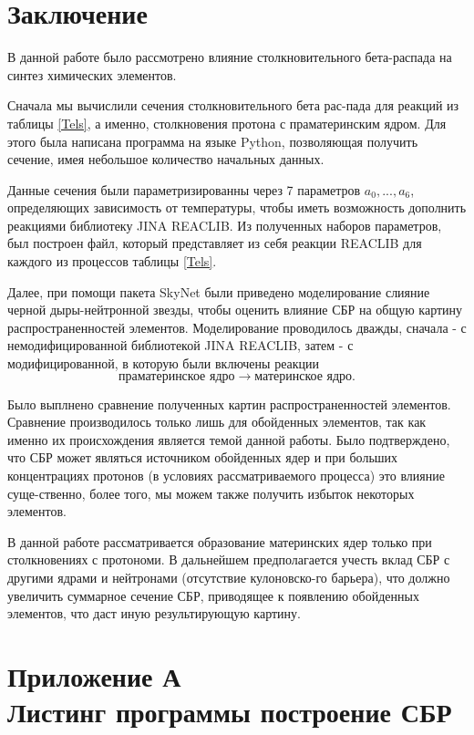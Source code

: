\documentclass[14pt, a4paper]{article}
\numberwithin{figure}{section}
\numberwithin{equation}{section}
\begin{document}
\section*{\centering Заключение}
В данной работе было рассмотрено влияние столкновительного бета-распада на синтез химических элементов.

Сначала мы вычислили сечения столкновительного бета рас-пада для реакций из таблицы \ref{Tels}, а именно, столкновения протона с праматеринским ядром. Для этого была написана программа на языке Python, позволяющая получить сечение, имея небольшое количество начальных данных.

Данные сечения были параметризированны через 7 параметров $a_0, ..., a_6$, определяющих зависимость от температуры, чтобы иметь возможность дополнить реакциями библиотеку JINA REACLIB. Из полученных наборов параметров, был построен файл, который представляет из себя реакции REACLIB для каждого из процессов таблицы \ref{Tels}.


Далее, при помощи пакета SkyNet были приведено моделирование слияние черной дыры-нейтронной звезды, чтобы оценить влияние СБР на общую картину распространенностей элементов. Моделирование проводилось дважды, сначала - с немодифицированной библиотекой JINA REACLIB, затем - с модифицированной, в которую были включены реакции $$\text{праматеринское ядро} \to \text{материнское ядро}.$$

Было выплнено сравнение полученных картин распространенностей элементов.  Сравнение производилось только лишь для обойденных элементов, так как именно их происхождения является темой данной работы. Было подтверждено, что СБР может являться источником обойденных ядер и при больших концентрациях протонов (в условиях рассматриваемого процесса) это влияние суще-ственно, более того, мы можем также получить избыток некоторых элементов.

В данной работе рассматривается образование материнских ядер только при столкновениях с протономи. В дальнейшем предполагается учесть вклад СБР с другими ядрами и нейтронами (отсутствие кулоновско-го барьера), что должно увеличить суммарное сечение СБР, приводящее к появлению обойденных элементов, что даст иную результирующую картину.

\newpage
{}



\newpage
{}
\section*{Приложение А\\Листинг программы построение СБР}\label{attachA}
\end{document}
